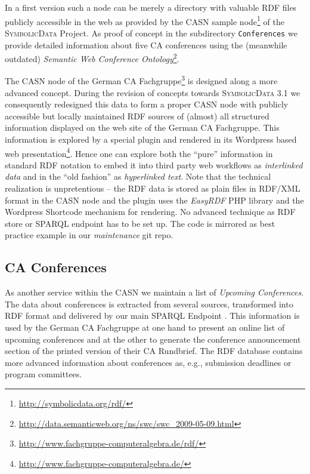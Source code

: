 \documentclass[a4paper,11pt]{article}
\def\SD{\textsc{SymbolicData}}
\begin{document}
In a first version such a node can be merely a directory with valuable RDF
files publicly accessible in the web as provided by the CASN sample
node\footnote{ \url{http://symbolicdata.org/rdf/}} of the {\SD} Project. As
proof of concept in the subdirectory \texttt{Conferences} we provide detailed
information about five CA conferences using the (meanwhile outdated)
\emph{Semantic Web Conference Ontology}\footnote{
  \url{http://data.semanticweb.org/ns/swc/swc_2009-05-09.html}}. 

The CASN node of the German CA Fachgruppe\footnote{
  \url{http://www.fachgruppe-computeralgebra.de/rdf/}} is designed along a more
advanced concept. During the revision of concepts towards {\SD} 3.1 we
consequently redesigned this data to form a proper CASN node with publicly
accessible but locally maintained RDF sources of (almost) all structured
information displayed on the web site of the German CA Fachgruppe.  This
information is explored by a special plugin and rendered in its Wordpress based
web presentation\footnote{ \url{http://www.fachgruppe-computeralgebra.de/}}.
Hence one can explore both the ``pure'' information in standard RDF notation to
embed it into third party web workflows as \emph{interlinked data} and in the
``old fashion'' as \emph{hyperlinked text}.  Note that the technical
realization is unpretentious -- the RDF data is stored as plain files in
RDF/XML format in the CASN node and the plugin uses the \emph{EasyRDF} PHP
library and the Wordpress Shortcode mechanism for rendering.  No advanced
technique as RDF store or SPARQL endpoint has to be set up.  The code is
mirrored as best practice example in our \emph{maintenance} git repo.

\subsection{CA Conferences}

As another service within the CASN we maintain a list of \emph{Upcoming
  Conferences}.  The data about conferences is extracted from several sources,
transformed into RDF format and delivered by our main SPARQL Endpoint
\cite{sdsparql}.  This information is used by the German CA Fachgruppe at one
hand to present an online list of upcoming conferences and at the other to
generate the conference announcement section of the printed version of their CA
Rundbrief.  The RDF database contains more advanced information about
conferences as, e.g., submission deadlines or program committees.
\end{document}

